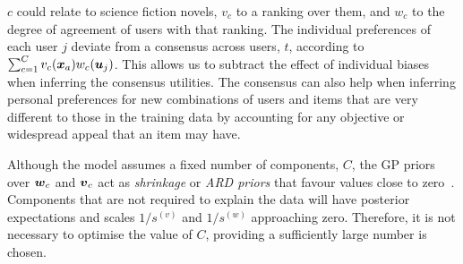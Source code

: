 $c$ could relate to science fiction novels, 
$v_c$ to a ranking over them,
and $w_c$ to the degree of agreement of users with that ranking.
The individual preferences of each user $j$ deviate from a consensus across users, $t$, according
to $\sum_{c=1}^C  v_c(\boldsymbol x_a) w_c(\boldsymbol u_j)$. 
This allows us to subtract the effect of individual biases when inferring the consensus utilities. 
The consensus can also help 
when inferring personal preferences for %
new combinations of users and items that are
very different to those in the training data by
 accounting for any objective or widespread appeal that an item may have.

Although the model assumes a fixed number of components, $C$,
the GP priors over $\boldsymbol w_c$ and $\boldsymbol v_c$ act as \emph{shrinkage}
or \emph{ARD priors} that favour values close to zero~\citep{mackay1995probable,psorakis2011overlapping}. 
Components that are not required to explain the data will have posterior
expectations and scales $1/s^{(v)}$ and $1/s^{(w)}$ approaching zero.
Therefore, %
it is not necessary to optimise the value of $C$, providing a sufficiently large number is chosen. 

